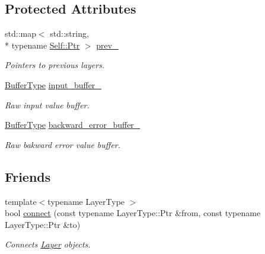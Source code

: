\subsection*{Protected Attributes}
\begin{DoxyCompactItemize}
\item 
std\-::map$<$ std\-::string, \\*
typename \hyperlink{classffnn_1_1layer_1_1_layer_ac336e7cc01ccf0117c5a4a2baf98add4}{Self\-::\-Ptr} $>$ \hyperlink{classffnn_1_1layer_1_1_layer_abe139156722efe30288b00becbd52cb9}{prev\-\_\-}
\begin{DoxyCompactList}\small\item\em Pointers to previous layers. \end{DoxyCompactList}\item 
\hyperlink{classffnn_1_1layer_1_1_layer_a3f2e9c375d9bcf80e6000e9e53ba212d}{Buffer\-Type} \hyperlink{classffnn_1_1layer_1_1_layer_ad4b5ac0708d6ada04d62df4fad377f1a}{input\-\_\-buffer\-\_\-}
\begin{DoxyCompactList}\small\item\em Raw input value buffer. \end{DoxyCompactList}\item 
\hyperlink{classffnn_1_1layer_1_1_layer_a3f2e9c375d9bcf80e6000e9e53ba212d}{Buffer\-Type} \hyperlink{classffnn_1_1layer_1_1_layer_a79d676e9b8bd04d1a438266206d4b321}{backward\-\_\-error\-\_\-buffer\-\_\-}
\begin{DoxyCompactList}\small\item\em Raw bakward error value buffer. \end{DoxyCompactList}\end{DoxyCompactItemize}
\subsection*{Friends}
\begin{DoxyCompactItemize}
\item 
{\footnotesize template$<$typename Layer\-Type $>$ }\\bool \hyperlink{classffnn_1_1layer_1_1_layer_afbf91ff52dc8c3e894968dcc27cdecd5}{connect} (const typename Layer\-Type\-::\-Ptr \&from, const typename Layer\-Type\-::\-Ptr \&to)
\begin{DoxyCompactList}\small\item\em Connects \hyperlink{classffnn_1_1layer_1_1_layer}{Layer} objects. \end{DoxyCompactList}\end{DoxyCompactItemize}


